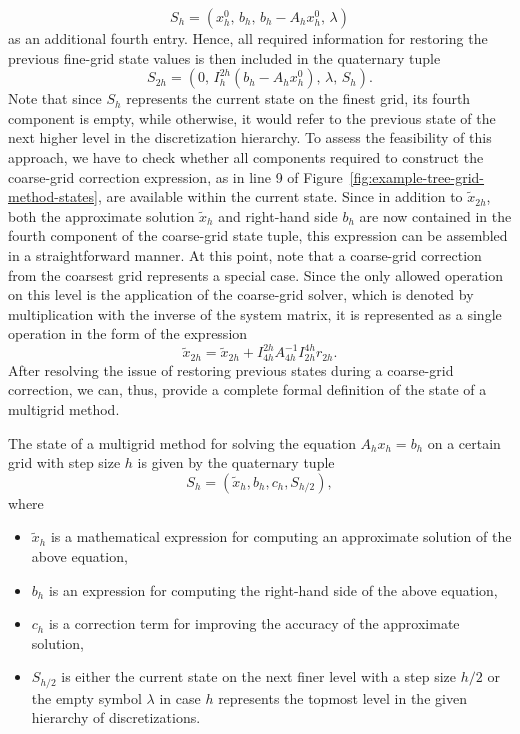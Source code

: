 \begin{equation*}
S_h = (x_{h}^0, \, b_h, \, b_{h} - A_h x_{h}^0, \, \lambda) 
\end{equation*} 
as an additional fourth entry. 
Hence, all required information for restoring the previous fine-grid state values is then included in the quaternary tuple 
\begin{equation*}
	S_{2h} = (0, \, I_{h}^{2h}(b_{h} - A_h x_{h}^0), \, \lambda, \, S_h).
\end{equation*}
Note that since $S_h$ represents the current state on the finest grid, its fourth component is empty, while otherwise, it would refer to the previous state of the next higher level in the discretization hierarchy.
To assess the feasibility of this approach, we have to check whether all components required to construct the coarse-grid correction expression, as in line 9 of Figure~\ref{fig:example-tree-grid-method-states}, are available within the current state.
Since in addition to $\tilde{x}_{2h}$, both the approximate solution $\tilde{x}_h$ and right-hand side $b_h$ are now contained in the fourth component of the coarse-grid state tuple, this expression can be assembled in a straightforward manner.
At this point, note that a coarse-grid correction from the coarsest grid represents a special case. 
Since the only allowed operation on this level is the application of the coarse-grid solver, which is denoted by multiplication with the inverse of the system matrix, it is represented as a single operation in the form of the expression 
\begin{equation*}
	\tilde{x}_{2h} = \tilde{x}_{2h} + I_{4h}^{2h} A_{4h}^{-1} I_{2h}^{4h} r_{2h}.
\end{equation*}
After resolving the issue of restoring previous states during a coarse-grid correction, we can, thus, provide a complete formal definition of the state of a multigrid method.
\begin{definition}
\label{def:multigrid-state}
The state of a multigrid method for solving the equation $A_{h} x_{h} = b_{h}$ on a certain grid with step size $h$ is given by the quaternary tuple
\begin{equation*}
	S_{h} = \left( \tilde{x}_{h}, b_{h}, c_{h}, S_{h/2}\right), 
\end{equation*}
where
\begin{itemize}
	\item $\tilde{x}_{h}$ is a mathematical expression for computing an approximate solution of the above equation,
	\item $b_{h}$ is an expression for computing the right-hand side of the above equation,
	\item $c_{h}$ is a correction term for improving the accuracy of the approximate solution,
	\item $S_{h/2}$ is either the current state on the next finer level with a step size $h/2$ or the empty symbol $\lambda$ in case $h$ represents the topmost level in the given hierarchy of discretizations.
\end{itemize}
\end{definition}
